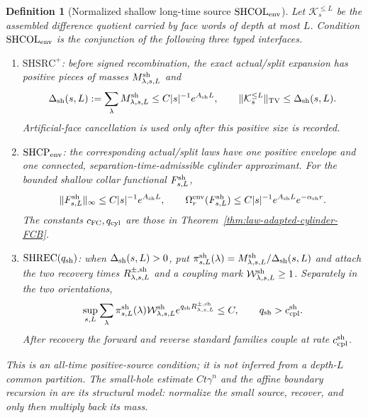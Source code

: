 \documentclass[11pt]{article}
\newtheorem{definition}[theorem]{Definition}
\begin{document}
\begin{definition}[Normalized shallow long-time source
$\mathrm{SHCOL}_{\rm env}$]
\label{def:shallow-collar-envelope}
Let $\mathcal K_s^{\le L}$ be the assembled difference quotient carried by
face words of depth at most $L$.  Condition
$\mathrm{SHCOL}_{\rm env}$ is the conjunction of the following three typed
interfaces.
\begin{enumerate}[label=\textup{(SH\arabic*)}]
\item $\mathrm{SHSRC}^{+}$: before signed recombination, the exact
      actual/split expansion has positive pieces of masses
      $M^{\rm sh}_{\lambda,s,L}$ and
      \begin{equation}
      \label{eq:shallow-positive-source-mass}
       \Delta_{\rm sh}(s,L):=\sum_\lambda
       M^{\rm sh}_{\lambda,s,L}
       \le C|s|^{-1}e^{A_{\rm sh}L},\qquad
       \|\mathcal K_s^{\le L}\|_{\rm TV}\le\Delta_{\rm sh}(s,L).
      \end{equation}
      Artificial-face cancellation is used only after this positive size is
      recorded.
\item $\mathrm{SHCP}_{\rm env}$: the corresponding actual/split laws have
      one positive envelope and one connected, separation-time-admissible
      cylinder approximant.  For the bounded shallow collar functional
      $F^{\rm sh}_{s,L}$,
\begin{equation}
\label{eq:shallow-collar-envelope}
 \|F^{\rm sh}_{s,L}\|_\infty
 \le C|s|^{-1}e^{A_{\rm sh}L},\qquad
 \Omega_r^{\rm env}(F^{\rm sh}_{s,L})
 \le C|s|^{-1}e^{A_{\rm sh}L}e^{-\alpha_{\rm sh}r}.
\end{equation}
      The constants $c_{\rm FC},q_{\rm cyl}$ are those in
      Theorem~\ref{thm:law-adapted-cylinder-FCB}.
\item $\mathrm{SHREC}(q_{\rm sh})$: when
      $\Delta_{\rm sh}(s,L)>0$, put
      $\pi^{\rm sh}_{s,L}(\lambda)=
      M^{\rm sh}_{\lambda,s,L}/\Delta_{\rm sh}(s,L)$ and attach the two
      recovery times $R^{\pm,\rm sh}_{\lambda,s,L}$ and a coupling mark
      $\mathcal W^{\rm sh}_{\lambda,s,L}\ge1$.  Separately in the two
      orientations,
      \begin{equation}
      \label{eq:normalized-shallow-recovery}
       \sup_{s,L}\sum_\lambda\pi^{\rm sh}_{s,L}(\lambda)
       \mathcal W^{\rm sh}_{\lambda,s,L}
       e^{q_{\rm sh}R^{\pm,\rm sh}_{\lambda,s,L}}\le C,
       \qquad q_{\rm sh}>c_{\rm cpl}^{\rm sh}.
      \end{equation}
      After recovery the forward and reverse standard families couple at
      rate $c_{\rm cpl}^{\rm sh}$.
\end{enumerate}
This is an all-time positive-source condition; it is not inferred from a
depth-$L$ common partition.  The small-hole estimate $Ct\gamma^n$ and the
affine boundary recursion in \cite{CanestrariHoles} are its structural
model: normalize the small source, recover, and only then multiply back its
mass.
\end{definition}
\end{document}
